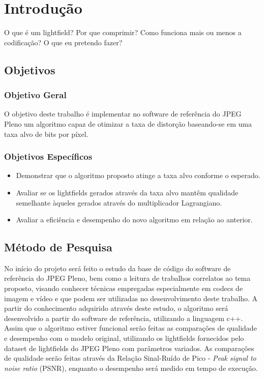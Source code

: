 \chapter{Introdução}
O que é um lightfield?
Por que comprimir?
Como funciona mais ou menos a codificação? \cite{lightfields_survey}
O que eu pretendo fazer?

\section{Objetivos}
    \subsection{Objetivo Geral}
        O objetivo deste trabalho é implementar no software de referência do JPEG Pleno um algoritmo capaz de otimizar 
        a taxa de distorção baseando-se em uma taxa alvo de bits por píxel.
    
    \subsection{Objetivos Específicos}
        \begin{itemize}
            \item Demonstrar que o algoritmo proposto atinge a taxa alvo conforme o esperado.
            \item Avaliar se os lightfields gerados através da taxa alvo mantêm qualidade semelhante àqueles gerados através do multiplicador
            Lagrangiano.
            \item Avaliar a eficiência e desempenho do novo algoritmo em relação ao anterior.
        \end{itemize}

\section{Método de Pesquisa}
    No início do projeto será feito o estudo da base de código do software de referência do JPEG Pleno, bem como a leitura de trabalhos correlatos ao
    tema proposto, visando conhecer técnicas empregadas especialmente em codecs de imagem e vídeo e que podem ser utilizadas no desenvolvimento deste 
    trabalho. A partir do conhecimento adquirido através deste estudo, o algoritmo será desenvolvido a partir do software de referência, utilizando a 
    linguagem c++. Assim que o algoritmo estiver funcional serão feitas as comparações de qualidade e desempenho com o modelo original, utilizando os 
    lightfields fornecidos pelo dataset de lightfields do JPEG Pleno com parâmetros variados. As comparações de qualidade serão feitas através da 
    Relação Sinal-Ruído de Pico - \textit{Peak signal to noise ratio} (PSNR), enquanto o desempenho será medido em tempo de execução.

